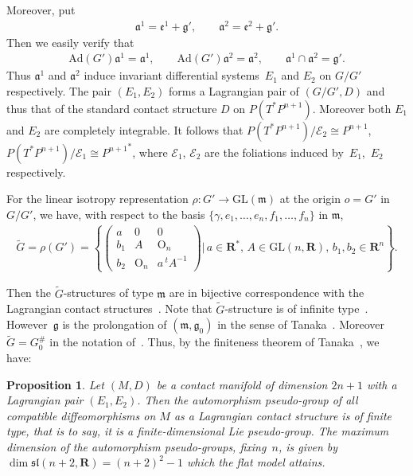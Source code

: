 \documentclass[pdftex]{sigma}
\newtheorem{Prop}[Th]{Proposition}
\begin{document}
Moreover, put
\begin{gather*}
\mathfrak{a}^1=\mathfrak{e}^1+\mathfrak{g}', \qquad
\mathfrak{a}^2=\mathfrak{e}^2+\mathfrak{g}'.
\end{gather*}
Then we easily verify that
\begin{gather*}
\mathrm{Ad}(G')\mathfrak{a}^1=\mathfrak{a}^1, \qquad
\mathrm{Ad}(G')\mathfrak{a}^2=\mathfrak{a}^2,\qquad
\mathfrak{a}^1\cap \mathfrak{a}^2=\mathfrak{g}'.
\end{gather*}
Thus $\mathfrak{a}^1$ and $\mathfrak{a}^2$ induce invariant
dif\/ferential systems~$E_1$ and $E_2$ on $G/G'$ respectively.
The pair $(E_1,E_2)$ forms
a Lagrangian pair of $(G/G', D)$ and thus
that of the standard contact structure $D$ on $P(T^*P^{n+1})$.
Moreover
both $E_1$ and $E_2$ are completely integrable.
It follows that
$P(T^*P^{n+1})/\mathcal{E}_2\cong P^{n+1}$, $P(T^*P^{n+1})/\mathcal{E}_1
\cong {P^{n+1}}^*$,
where
$\mathcal{E}_1$, $\mathcal{E}_2$ are the foliations induced by~$E_1$,~$E_2$
respectively.

For the linear isotropy representation
$\rho \colon  G' \longrightarrow \mathrm{GL}(\mathfrak{m})$ at the origin
$o = G'$ in $G/G'$,
we have, with respect to the basis $\{ \gamma, e_1, \dots, e_n, f_1, \dots, f_n \}$ in $\mathfrak{m}$,
\begin{gather*}
\tilde{G} =\rho(G')
          =\left\{{\begin{pmatrix}
                      a & 0 & 0 \\
                      b_1 & A & \mathrm{O}_n \\
                      b_2 & \mathrm{O}_n & a\, {}^t\! A^{-1}
                    \end{pmatrix}} \Bigg\vert \,
a\in \mathbf{R}^*,\, A\in \mathrm{GL}(n,{\mathbf{R}}), \,b_1, b_2\in \mathbf{R}^n
\right\}.
\end{gather*}

Then the $\tilde{G}$-structures of type $\mathfrak{m}$ are in bijective
correspondence with the Lagrangian contact structures~\cite[Theorem~5.1]{Tak}.
Note that $\tilde{G}$-structure is of inf\/inite type~\cite[Chapter~I]{K}.
How\-ever~${\mathfrak g}$ is the prolongation of $({\mathfrak m}, {\mathfrak g}_0)$
in the sense of Tanaka~\cite{Tan1,Y}. Moreover
$\tilde{G} = G_0^{\#}$ in the notation of~\cite{Tan}.
Thus, by the f\/initeness theorem of Tanaka~\cite[Corollary~2]{Tan},  we have:

\begin{Prop}
Let $(M,D)$ be a contact manifold of dimension $2n+1$
with a Lagrangian pair $(E_1,E_2)$.
Then the automorphism pseudo-group of all compatible
diffeomorphisms on $M$
as a Lagrangian contact structure
is of finite type, that is to say,
it is a finite-dimensional Lie pseudo-group.
The maximum dimension of the automorphism pseudo-groups, fixing~$n$, is given by
$\dim \mathfrak{sl}(n+2,{\mathbf{R}}) = (n+2)^2-1$
which the flat model attains.
\end{Prop}
\end{document}
